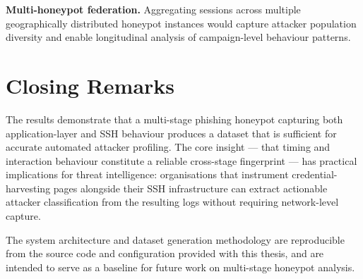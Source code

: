 \textbf{Multi-honeypot federation.} Aggregating sessions across
multiple geographically distributed honeypot instances would capture
attacker population diversity and enable longitudinal analysis of
campaign-level behaviour patterns.

\section{Closing Remarks}

The results demonstrate that a multi-stage phishing honeypot capturing
both application-layer and SSH behaviour produces a dataset that is
sufficient for accurate automated attacker profiling. The core insight
— that timing and interaction behaviour constitute a reliable
cross-stage fingerprint — has practical implications for threat
intelligence: organisations that instrument credential-harvesting pages
alongside their SSH infrastructure can extract actionable attacker
classification from the resulting logs without requiring network-level
capture.

The system architecture and dataset generation methodology are
reproducible from the source code and configuration provided with this
thesis, and are intended to serve as a baseline for future work on
multi-stage honeypot analysis.
